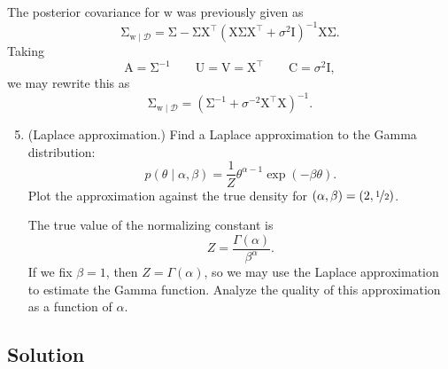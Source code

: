 \documentclass{article}
\newcommand{\given}{\mid}
\newcommand{\mc}[1]{\mathcal{#1}}
\newcommand{\data}{\mc{D}}
\newcommand{\mat}[1]{\bm{\mathrm{#1}}}
\renewcommand{\vec}[1]{\bm{\mathrm{#1}}}
\newcommand{\trans}{^\top}
\newcommand{\inv}{^{-1}}
\begin{document}
The posterior covariance for $\vec{w}$ was previously given as
\begin{equation*}
  \mat{\Sigma}_{\vec{w}\given\data}
  =
  \mat{\Sigma}
  -
  \mat{\Sigma}
  \mat{X}\trans
  (\mat{X}\mat{\Sigma}\mat{X}\trans + \sigma^2 \mat{I})\inv
  \mat{X}
  \mat{\Sigma}.
\end{equation*}
Taking
\begin{equation*}
  \mat{A} = \mat{\Sigma}\inv
  \qquad
  \mat{U} = \mat{V} = \mat{X}\trans
  \qquad
  \mat{C} = \sigma^2 \mat{I},
\end{equation*}
we may rewrite this as
\begin{equation*}
  \mat{\Sigma}_{\vec{w}\given\data}
  =
  (\mat{\Sigma}\inv
  +
  \sigma^{-2}
  \mat{X}\trans\mat{X})\inv.
\end{equation*}

\clearpage
\begin{enumerate}
\setcounter{enumi}{4}
\item
  (Laplace approximation.)
  Find a Laplace approximation to the Gamma distribution:
  \begin{equation*}
    p(\theta \given \alpha, \beta)
    =
    \frac{1}{Z}
    \theta^{\alpha - 1}
    \exp(-\beta\theta).
  \end{equation*}
  Plot the approximation against the true density for $(\alpha, \beta)
  = (2, \nicefrac{1}{2})$.

  The true value of the normalizing constant is
  \begin{equation*}
    Z = \frac{\Gamma(\alpha)}{\beta^\alpha}.
  \end{equation*}
  If we fix $\beta = 1$, then $Z = \Gamma(\alpha)$, so we may use the
  Laplace approximation to estimate the Gamma function.  Analyze the
  quality of this approximation as a function of $\alpha$.
\end{enumerate}

\subsection*{Solution}
\end{document}
